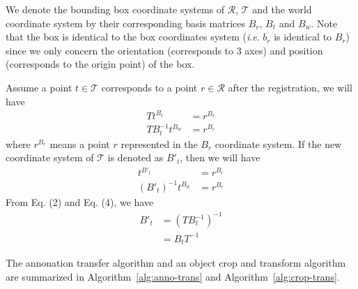 \documentclass[letterpaper, 10 pt, conference]{ieeeconf}  %
\begin{document}
We denote the bounding box coordinate systems of $\mathcal{R}$, $\mathcal{T}$ and the world coordinate system by their corresponding basis matrices $B_r$, $B_t$ and $B_w$.  Note that the box is identical to the box coordinates system (\textit{i}.\textit{e}. $b_r$ is identical to $B_r$) since we only concern the orientation (corresponds to 3 axes) and position
(corresponds to the origin point) of the box.

Assume a point $t \in \mathcal{T}$ corresponds to a point $r \in \mathcal{R}$ after the registration, we will have
\begin{align}
T t^{B_t} &= r^{B_r}\\
T B_t^{-1}t^{B_w} &= r^{B_r} \label{eq:eq1}
\end{align}
where $r^{B_r}$ means a point $r$ represented in the $B_r$ coordinate system. If the new coordinate system of $\mathcal{T}$ is denoted as $B'_t$, then we will have
\begin{align} 
t^{B'_t} &= r^{B_r}\\
(B'_t)^{-1}t^{B_w} &= r^{B_r} \label{eq:eq2}
\end{align}
From Eq. (2) and Eq. (4), we have
\begin{align}
{B'_t} & = (T B_t^{-1})^{-1}\\
& = B_t T^{-1} \label{eq:eq5}
\end{align}

The annonation transfer algorithm and an object crop and transform algorithm are summarized in Algorithm~\ref{alg:anno-trans} and Algorithm~\ref{alg:crop-trans}.
\end{document}
